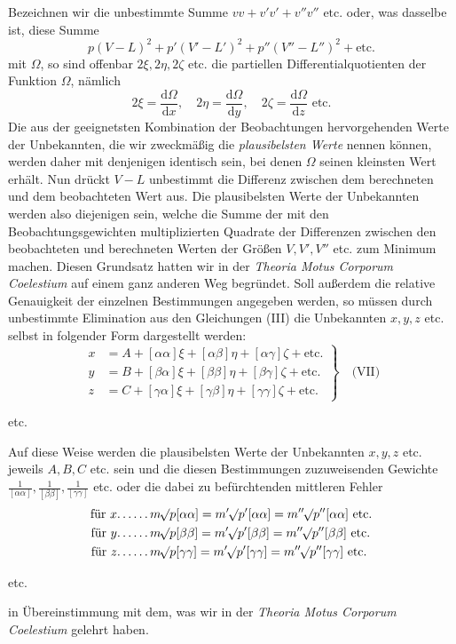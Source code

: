 Bezeichnen wir die unbestimmte Summe \(vv+v'v'+v''v''\text{ etc.}\) oder, was dasselbe ist, diese Summe
\[
p(V-L)^2+p'(V'-L')^2+p''(V''-L'')^2+\text{etc.}
\]
mit \(\Omega\), so sind offenbar \(2\xi,2\eta,2\zeta\) etc. die partiellen Differentialquotienten der Funktion \(\Omega\), nämlich
\[
2\xi=\frac{\mathrm{d}\Omega}{\mathrm{d}x},\quad2\eta=\frac{\mathrm{d}\Omega}{\mathrm{d}y},\quad2\zeta=\frac{\mathrm{d}\Omega}{\mathrm{d}z}\text{ etc.}
\]
Die aus der geeignetsten Kombination der Beobachtungen hervorgehenden Werte der Unbekannten, die wir zweckmäßig die \textit{plausibelsten Werte} nennen können, werden daher mit denjenigen identisch sein, bei denen \(\Omega\) seinen kleinsten Wert erhält. Nun drückt \(V-L\) unbestimmt die Differenz zwischen dem berechneten und dem beobachteten Wert aus. Die plausibelsten Werte der Unbekannten werden also diejenigen sein, welche die Summe der mit den Beobachtungsgewichten multiplizierten Quadrate der Differenzen zwischen den beobachteten und berechneten Werten der Größen \(V,V',V''\) etc. zum Minimum machen. Diesen Grundsatz hatten wir in der \textit{Theoria Motus Corporum Coelestium} auf einem ganz anderen Weg begründet. Soll außerdem die relative Genauigkeit der einzelnen Bestimmungen angegeben werden, so müssen durch unbestimmte Elimination aus den Gleichungen (III) die Unbekannten \(x,y,z\) etc. selbst in folgender Form dargestellt werden:
\[
\left.\begin{aligned}
x&=A+[\alpha\alpha]\xi+[\alpha\beta]\eta+[\alpha\gamma]\zeta+\text{etc.}\\
y&=B+[\beta\alpha]\xi+[\beta\beta]\eta+[\beta\gamma]\zeta+\text{etc.}\\
z&=C+[\gamma\alpha]\xi+[\gamma\beta]\eta+[\gamma\gamma]\zeta+\text{etc.}
\end{aligned}\right\}\quad\text{(VII)}
\]
\begin{center}etc.\end{center}
Auf diese Weise werden die plausibelsten Werte der Unbekannten \(x,y,z\) etc. jeweils \(A,B,C\) etc. sein und die diesen Bestimmungen zuzuweisenden Gewichte \(\frac1{[\alpha\alpha]},\frac1{[\beta\beta]},\frac1{[\gamma\gamma]}\) etc. oder die dabei zu befürchtenden mittleren Fehler
\[
\begin{aligned}
\text{für }x\mathord{.}\,\mathord{.}\,\mathord{.}\,\mathord{.}\,\mathord{.}\,\mathord{.}\,&m\BareRoot{p[\alpha\alpha]}=m'\BareRoot{p'[\alpha\alpha]}=m''\BareRoot{p''[\alpha\alpha]}\text{ etc.}\\
\text{für }y\mathord{.}\,\mathord{.}\,\mathord{.}\,\mathord{.}\,\mathord{.}\,\mathord{.}\,&m\BareRoot{p[\beta\beta]}=m'\BareRoot{p'[\beta\beta]}=m''\BareRoot{p''[\beta\beta]}\text{ etc.}\\
\text{für }z\mathord{.}\,\mathord{.}\,\mathord{.}\,\mathord{.}\,\mathord{.}\,\mathord{.}\,&m\BareRoot{p[\gamma\gamma]}=m'\BareRoot{p'[\gamma\gamma]}=m''\BareRoot{p''[\gamma\gamma]}\text{ etc.}
\end{aligned}
\]
\begin{center}etc.\end{center}
in Übereinstimmung mit dem, was wir in der \textit{Theoria Motus Corporum Coelestium} gelehrt haben.

